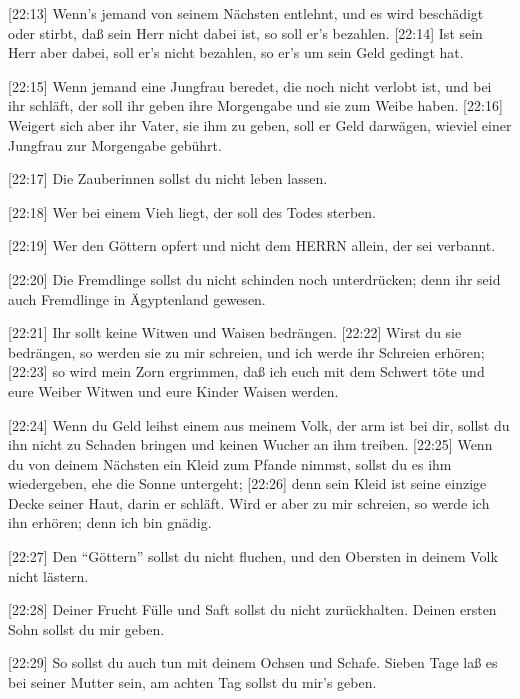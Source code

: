  {[}22:13{]} Wenn's jemand von seinem Nächsten entlehnt,
und es wird beschädigt oder stirbt, daß sein Herr nicht dabei ist, so
soll er's bezahlen.  {[}22:14{]} Ist sein Herr aber dabei,
soll er's nicht bezahlen, so er's um sein Geld gedingt hat.

 {[}22:15{]} Wenn jemand eine Jungfrau beredet, die noch
nicht verlobt ist, und bei ihr schläft, der soll ihr geben ihre
Morgengabe und sie zum Weibe haben.  {[}22:16{]} Weigert
sich aber ihr Vater, sie ihm zu geben, soll er Geld darwägen, wieviel
einer Jungfrau zur Morgengabe gebührt.

 {[}22:17{]} Die Zauberinnen sollst du nicht leben lassen.

 {[}22:18{]} Wer bei einem Vieh liegt, der soll des Todes
sterben.

 {[}22:19{]} Wer den Göttern opfert und nicht dem HERRN
allein, der sei verbannt.

 {[}22:20{]} Die Fremdlinge sollst du nicht schinden noch
unterdrücken; denn ihr seid auch Fremdlinge in Ägyptenland gewesen.

 {[}22:21{]} Ihr sollt keine Witwen und Waisen bedrängen.
 {[}22:22{]} Wirst du sie bedrängen, so werden sie zu mir
schreien, und ich werde ihr Schreien erhören;  {[}22:23{]}
so wird mein Zorn ergrimmen, daß ich euch mit dem Schwert töte und eure
Weiber Witwen und eure Kinder Waisen werden.

 {[}22:24{]} Wenn du Geld leihst einem aus meinem Volk, der
arm ist bei dir, sollst du ihn nicht zu Schaden bringen und keinen
Wucher an ihm treiben.  {[}22:25{]} Wenn du von deinem
Nächsten ein Kleid zum Pfande nimmst, sollst du es ihm wiedergeben, ehe
die Sonne untergeht;  {[}22:26{]} denn sein Kleid ist seine
einzige Decke seiner Haut, darin er schläft. Wird er aber zu mir
schreien, so werde ich ihn erhören; denn ich bin gnädig.

 {[}22:27{]} Den ``Göttern'' sollst du nicht fluchen, und
den Obersten in deinem Volk nicht lästern.

 {[}22:28{]} Deiner Frucht Fülle und Saft sollst du nicht
zurückhalten. Deinen ersten Sohn sollst du mir geben.

 {[}22:29{]} So sollst du auch tun mit deinem Ochsen und
Schafe. Sieben Tage laß es bei seiner Mutter sein, am achten Tag sollst
du mir's geben.

